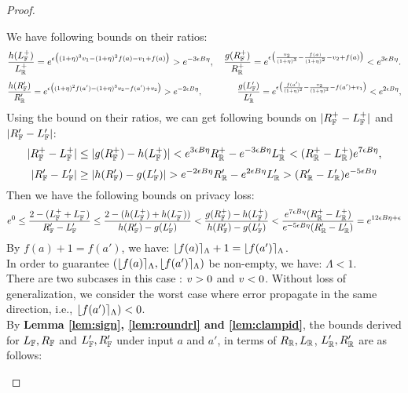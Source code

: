 \documentclass[a4paper,11pt]{article}
\begin{document}
\begin{proof}
\begin{itemize}
		We have following bounds on their ratios:
		\[
		\frac{h(L_{\mathbb{F}}^+)}{L_{\mathbb{R}}^+} 
		= e^{\epsilon 
		\big(
		(1 + \eta)^3 v_1 - (1 + \eta)^2f(a) - v_1 + f(a)
		\big)}
		> e^{-3\epsilon B \eta},
		~~~
		\frac{g{(R_{\mathbb{F}}^+)}}{R_{\mathbb{R}}^+} = e^{\epsilon 
		\big(
		\frac{v_2}{(1 + \eta)^3} - \frac{f(a)}{(1 + \eta)^2} - v_2 + f(a)
		\big)}
		< e^{3\epsilon B \eta}.
		\]
		\[
		\frac{h(R_{\mathbb{F}}')}{R_{\mathbb{R}}'} = e^{\epsilon 
		\big(
		(1 + \eta)^2f(a') - (1 + \eta)^3 v_2 - f(a') + v_2
		\big)}
		> e^{-2\epsilon B \eta},
		~~~~~~~~~~~~
		\frac{g{(L_{\mathbb{F}}')}}{L_{\mathbb{R}}'} = e^{\epsilon 
		\big(
		\frac{f(a')}{(1 + \eta)^2} - \frac{v_2}{(1 + \eta)^3} - f(a') + v_1
		\big)}
		< e^{2\epsilon B \eta},
		\]
		Using the bound on their ratios, we can get following bounds on $|R_{\mathbb{F}}^+ - L_{\mathbb{F}}^+|$ 
		and $|R_{\mathbb{F}}' - L_{\mathbb{F}}'|$:
		\[
		|R_{\mathbb{F}}^+ - L_{\mathbb{F}}^+|
		\leq
		|g{(R_{\mathbb{F}}^+)} - h(L_{\mathbb{F}}^+)| 
		< e^{3\epsilon B \eta} R_{\mathbb{R}}^+ - e^{-3\epsilon B \eta}L_{\mathbb{R}}^+ 
		< (R_{\mathbb{R}}^+ - L_{\mathbb{R}}^+) e^{7\epsilon B \eta},
		\]
		\[
		|R_{\mathbb{F}}' - L_{\mathbb{F}}'|
		\geq
		|h{(R_{\mathbb{F}}')} - g(L_{\mathbb{F}}')| 
		> e^{-2\epsilon B \eta} R_{\mathbb{R}}' - e^{2\epsilon B \eta}L_{\mathbb{R}}' 
		> (R_{\mathbb{R}}' - L_{\mathbb{R}}') e^{-5\epsilon B \eta}
		\]
		Then we have the following bounds on privacy loss:
		\[
		e^0
		\leq
		\frac{2 - (L_{\mathbb{F}}^+ + L_{\mathbb{F}}^-)}
		{R_{\mathbb{F}}' - L_{\mathbb{F}}'}
		\leq
		\frac{2 - (h(L_{\mathbb{F}}^+) + h(L_{\mathbb{F}}^-))}
		{h(R_{\mathbb{F}}') - g(L_{\mathbb{F}}')}
		< \frac{g(R_{\mathbb{F}}^+) - h(L_{\mathbb{F}}^+)}
		{h(R_{\mathbb{F}}') - g(L_{\mathbb{F}}')}
		< \frac{e^{7\epsilon B \eta}
		(R_{\mathbb{R}}^+ - L_{\mathbb{R}}^+)}
		{e^{-5\epsilon B \eta} 
		(R_{\mathbb{R}}' - L_{\mathbb{R}}')}
		= e^{12\epsilon B \eta + \epsilon}
		\]
		By $f(a) + 1 = f(a')$, we have:
		$\lfloor f(a) \rceil_{\Lambda} + 1 = \lfloor f(a') \rceil_{\Lambda}$.
		\\
		In order to guarantee $(\lfloor f(a) \rceil_{\Lambda}, \lfloor f(a') \rceil_{\Lambda})$ be non-empty, we  have: 
		$\Lambda < 1$.
		\\
		There are two subcases in this case : 
		$v >0$ and $v < 0$.
		Without loss of generalization, we consider the worst case where error propagate in the same direction, i.e., $\lfloor f(a') \rceil_{\Lambda}) < 0$.
		\\
		By \textbf{Lemma \ref{lem:sign}, \ref{lem:roundrl} and \ref{lem:clampid}}, the bounds derived for 
		$L_{\mathbb{F}}, R_{\mathbb{F}}$ and $L_{\mathbb{F}}', R_{\mathbb{F}}'$ under input $a$ and $a'$, in terms of $R_{\mathbb{R}}, L_{\mathbb{R}}$, $L_{\mathbb{R}}', R_{\mathbb{R}}'$ are as follows:
		\\

\end{itemize}
\end{proof}
\end{document}
